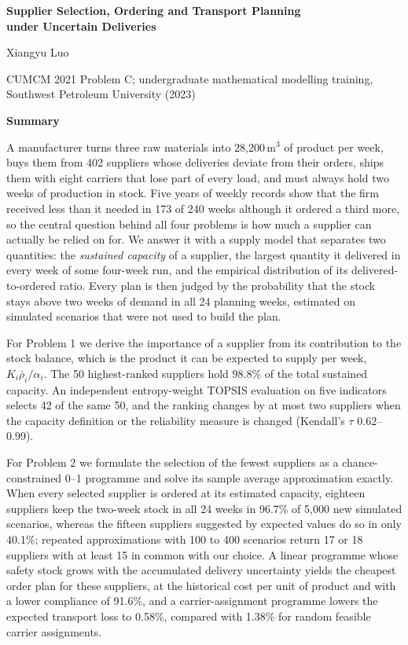 \documentclass[11pt,a4paper]{article}
\begin{document}
\thispagestyle{empty}
\begin{center}
{\LARGE\bfseries Supplier Selection, Ordering and Transport Planning\\[3pt] under Uncertain Deliveries\par}
\vspace{6pt}
{\normalsize Xiangyu Luo\par}
{\small CUMCM 2021 Problem C; undergraduate mathematical modelling training, Southwest Petroleum University (2023)\par}
\vspace{10pt}
{\Large\bfseries Summary\par}
\end{center}

A manufacturer turns three raw materials into 28{,}200\,m$^3$ of product per week, buys them from 402 suppliers whose deliveries deviate from their orders, ships them with eight carriers that lose part of every load, and must always hold two weeks of production in stock.
Five years of weekly records show that the firm received less than it needed in 173 of 240 weeks although it ordered a third more, so the central question behind all four problems is how much a supplier can actually be relied on for.
We answer it with a supply model that separates two quantities: the \emph{sustained capacity} of a supplier, the largest quantity it delivered in every week of some four-week run, and the empirical distribution of its delivered-to-ordered ratio.
Every plan is then judged by the probability that the stock stays above two weeks of demand in all 24 planning weeks, estimated on simulated scenarios that were not used to build the plan.

For Problem 1 we derive the importance of a supplier from its contribution to the stock balance, which is the product it can be expected to supply per week, $K_i\bar\rho_i/\alpha_i$.
The 50 highest-ranked suppliers hold 98.8\% of the total sustained capacity.
An independent entropy-weight TOPSIS evaluation on five indicators selects 42 of the same 50, and the ranking changes by at most two suppliers when the capacity definition or the reliability measure is changed (Kendall's $\tau$ 0.62--0.99).

For Problem 2 we formulate the selection of the fewest suppliers as a chance-constrained 0--1 programme and solve its sample average approximation exactly.
When every selected supplier is ordered at its estimated capacity, eighteen suppliers keep the two-week stock in all 24 weeks in 96.7\% of 5{,}000 new simulated scenarios, whereas the fifteen suppliers suggested by expected values do so in only 40.1\%; repeated approximations with 100 to 400 scenarios return 17 or 18 suppliers with at least 15 in common with our choice.
A linear programme whose safety stock grows with the accumulated delivery uncertainty yields the cheapest order plan for these suppliers, at the historical cost per unit of product and with a lower compliance of 91.6\%, and a carrier-assignment programme lowers the expected transport loss to 0.58\%, compared with 1.38\% for random feasible carrier assignments.
\end{document}
